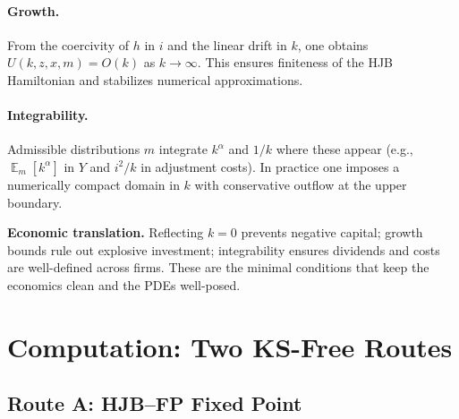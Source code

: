 \documentclass[11pt,letterpaper,oneside]{article}
\numberwithin{equation}{section}
\newcommand{\ac}[1]{{\mdseries\textsc{#1}}}
\DeclareMathOperator{\E}{\mathbb{E}}
\newcommand{\1}{\mathbf{1}}
\begin{document}
\paragraph{Growth.} From the coercivity of $h$ in $i$ and the linear drift in $k$, one obtains $U(k,z,x,m)=O(k)$ as $k\to\infty$. This ensures finiteness of the HJB Hamiltonian and stabilizes numerical approximations.

\paragraph{Integrability.} Admissible distributions $m$ integrate $k^\alpha$ and $1/k$ where these appear (e.g., $\E_m[k^\alpha]$ in $Y$ and $i^2/k$ in adjustment costs). In practice one imposes a numerically compact domain in $k$ with conservative outflow at the upper boundary.

\begin{tcolorbox}[didacticstyle]
\textbf{Economic translation.} Reflecting $k=0$ prevents negative capital; growth bounds rule out explosive investment; integrability ensures dividends and costs are well-defined across firms. These are the minimal conditions that keep the economics clean and the PDEs well-posed.
\end{tcolorbox}

\section{Computation: Two KS-Free Routes}

\subsection{Route A: \ac{HJB}--\ac{FP} Fixed Point}\label{sec:routeA}
\end{document}
